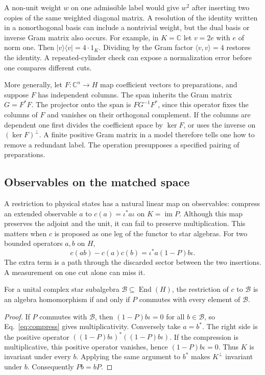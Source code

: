 \documentclass[11pt,letterpaper]{article}
\newcommand{\CC}{\mathbb C}
\newcommand{\im}{\operatorname{im}}
\begin{document}
A non-unit weight \(w\) on one admissible label would give \(w^2\) after
inserting two copies of the same weighted diagonal matrix. A resolution of
the identity written in a nonorthogonal basis can include a nontrivial
weight, but the dual basis or inverse Gram matrix also occurs. For example,
in \(K=\CC\) let \(v=2e\) with \(e\) of norm one. Then
\(|v\rangle\langle v|=4\cdot 1_K\). Dividing by the Gram factor
\(\langle v,v\rangle=4\) restores the identity. A repeated-cylinder check
can expose a normalization error before one compares different cuts.

More generally, let \(F:\CC^n\to H\) map coefficient vectors to
preparations, and suppose \(F\) has independent columns. The span inherits
the Gram matrix \(G=F^*F\). The projector onto the span is
\(FG^{-1}F^*\), since this operator fixes the columns of \(F\) and vanishes
on their orthogonal complement. If the columns are dependent one first
divides the coefficient space by \(\ker F\), or uses the inverse on
\((\ker F)^\perp\). A finite positive Gram matrix in a model therefore tells
one how to remove a redundant label. The operation presupposes a specified
pairing of preparations.

\subsection{Observables on the matched space}
A restriction to physical states has a natural linear map on observables:
compress an extended observable \(a\) to
\(c(a)=\iota^*a\iota\) on \(K=\im P\). Although this map preserves the
adjoint and the unit, it can fail to preserve multiplication.
This matters when \(c\) is proposed as one leg of the functor to
star algebras. For two bounded operators \(a,b\) on \(H\),
\begin{equation}
 c(ab)-c(a)c(b)=\iota^* a(1-P)b\iota .
 \label{eq:compress}
\end{equation}
The extra term is a path through the discarded sector between the two
insertions. A measurement on one cut alone can miss it.

\begin{proposition}
\label{prop:multiplicative}
For a unital complex star subalgebra \(\mathcal B\subseteq
\operatorname{End}(H)\), the restriction of \(c\) to \(\mathcal B\) is an
algebra homomorphism if and only if \(P\) commutes with every element of
\(\mathcal B\).
\end{proposition}
\begin{proof}
If \(P\) commutes with \(\mathcal B\), then
\((1-P)b\iota=0\) for all \(b\in\mathcal B\), so
Eq.~\eqref{eq:compress} gives multiplicativity.
Conversely take \(a=b^*\). The right side is the positive operator
\(((1-P)b\iota)^*((1-P)b\iota)\). If the compression is
multiplicative, this positive operator vanishes, hence
\((1-P)b\iota=0\). Thus \(K\) is invariant under every \(b\).
Applying the same argument to \(b^*\) makes \(K^\perp\) invariant
under \(b\). Consequently \(P b=b P\).
\end{proof}
\end{document}
